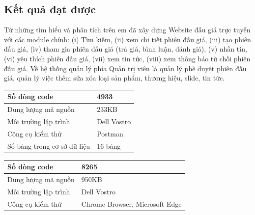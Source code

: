 \documentclass[../DoAn.tex]{subfiles}
\begin{document}
\subsection{Kết quả đạt được}
Từ những tìm hiểu và phân tích trên em đã xây dựng Website đấu giá trực tuyến với các module chính: (i) Tìm kiếm, (ii) xem chi tiết phiên đấu giá, (iii) tạo phiên đấu giá, (iv) tham gia phiên đấu giá (trả giá, bình luận, đánh giá), (v) nhắn tin, (vi) yêu thích phiên đấu giá, (vii) xem tin tức, (viii) xem thông báo từ chối phiên đấu giá. Về hệ thống quản lý phía Quản trị viên là quản lý phê duyệt phiên đấu giá, quản lý việc thêm sửa xóa loại sản phẩm, thương hiệu, slide, tin tức.
    \tabletail{\hline}
    \label{bang410}
    \begin{supertabular}{| p{.45\textwidth}| p{.45\textwidth} |} 
    \hline
        Số dòng code& 4933\\\hline
        Dung lượng mã nguồn&233KB \\\hline
        Môi trường lập trình&Dell Vostro \\\hline
        Công cụ kiểm thử & Postman\\\hline
        Số bảng trong cơ sở dữ liệu  &16 bảng \\\hline
    \end{supertabular}
    \tabletail{\hline}
    \label{bang411}
    \begin{supertabular}{| p{.45\textwidth}| p{.45\textwidth} |} 
    \hline
        Số dòng code& 8265\\\hline
        Dung lượng mã nguồn&950KB \\\hline
        Môi trường lập trình&Dell Vostro \\\hline
        Công cụ kiểm thử & Chrome Browser, Microsoft Edge\\\hline
    \end{supertabular}
\end{document}
